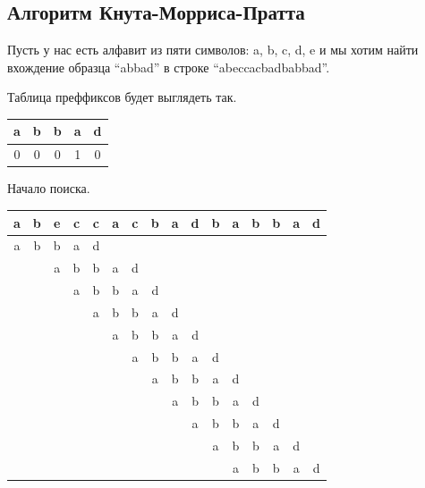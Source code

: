 \documentclass[a4paper,14pt]{report}
\begin{document}
\subsection*{Алгоритм Кнута-Морриса-Пратта}

Пусть у нас есть алфавит из пяти символов: a, b, c, d, e и мы хотим найти вхождение образца “abbad” в строке “abeccacbadbabbad”.

Таблица преффиксов будет выглядеть так.

\begin{table}[h]
		\begin{tabular}{| c | c | c | c | c |}
	 	\hline
		a & b & b & a & d \\ \hline
    0 & 0 & 0 & 1 & 0 \\ \hline
		\end{tabular}
\end{table}

Начало поиска.

\begin{table}[h]
		\begin{tabular}{| c | c | c | c | c | c | c | c | c | c | c | c | c | c | c | c |}
	 	\hline
		a & b & e & c & c & a & c & b & a & d & b & a & b & b & a & d \\ \hline
    a & b & b & a & d & & & & & & & & & & & \\ \hline
		& & a & b & b & a & d & & & & & & & & & \\ \hline
	  & & & a & b & b & a & d & & & & & & & & \\ \hline
		& & & & a & b & b & a & d & & & & & & & \\ \hline
		& & & & & a & b & b & a & d & & & & & & \\ \hline
		& & & & & & a & b & b & a & d & & & & & \\ \hline
		& & & & & & & a & b & b & a & d & & & & \\ \hline
		& & & & & & & & a & b & b & a & d & & & \\ \hline
		& & & & & & & & & a & b & b & a & d & & \\ \hline
		& & & & & & & & & & a & b & b & a & d & \\ \hline
		& & & & & & & & & & & a & b & b & a & d \\ \hline
		\end{tabular}
\end{table}
\end{document}
